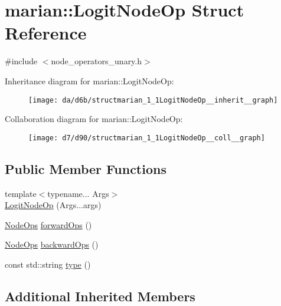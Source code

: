 \hypertarget{structmarian_1_1LogitNodeOp}{}\section{marian\+:\+:Logit\+Node\+Op Struct Reference}
\label{structmarian_1_1LogitNodeOp}


{\ttfamily \#include $<$node\+\_\+operators\+\_\+unary.\+h$>$}



Inheritance diagram for marian\+:\+:Logit\+Node\+Op\+:
\nopagebreak
\begin{figure}[H]
\begin{center}
\leavevmode
\texttt{[image: da/d6b/structmarian\_1\_1LogitNodeOp\_\_inherit\_\_graph]}
\end{center}
\end{figure}


Collaboration diagram for marian\+:\+:Logit\+Node\+Op\+:
\nopagebreak
\begin{figure}[H]
\begin{center}
\leavevmode
\texttt{[image: d7/d90/structmarian\_1\_1LogitNodeOp\_\_coll\_\_graph]}
\end{center}
\end{figure}
\subsection*{Public Member Functions}
\begin{DoxyCompactItemize}
\item 
{\footnotesize template$<$typename... Args$>$ }\\\hyperlink{structmarian_1_1LogitNodeOp_aa7d4f02bd4c56cecfa7d408eab860483}{Logit\+Node\+Op} (Args...\+args)
\item 
\hyperlink{namespacemarian_a4956376218cc236016c20bc4071470da}{Node\+Ops} \hyperlink{structmarian_1_1LogitNodeOp_a01cdefe75c98513764cdbcdc8999b5ef}{forward\+Ops} ()
\item 
\hyperlink{namespacemarian_a4956376218cc236016c20bc4071470da}{Node\+Ops} \hyperlink{structmarian_1_1LogitNodeOp_a574fae9f1ecf9e601c5ab0312b88d136}{backward\+Ops} ()
\item 
const std\+::string \hyperlink{structmarian_1_1LogitNodeOp_a89ce677c70d1f65f2a359336b6f14543}{type} ()
\end{DoxyCompactItemize}
\subsection*{Additional Inherited Members}


